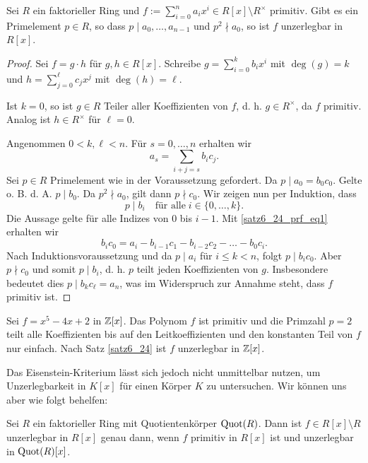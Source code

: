 \begin{satz}\label{satz6_24}
	Sei $R$ ein faktorieller Ring und $f := \sum_{i=0}^n a_i x^i \in R[x] \setminus R^\times$ primitiv. Gibt es ein Primelement $p \in R$, so dass $p \mid a_0, \dots, a_{n-1}$ und $p^2 \nmid a_0$, so ist $f$ unzerlegbar in $R[x]$.
\end{satz}
\begin{proof}
	Sei $f = g\cdot h$ für $g, h \in R[x]$. Schreibe $g = \sum_{i=0}^k b_i x^i$ mit $\deg(g) = k$ und $h = \sum_{j = 0}^\ell c_j x^j$ mit $\deg(h) = \ell$.
	
	Ist $k = 0$, so ist $g \in R$ Teiler aller Koeffizienten von $f$, d. h. $g \in R^\times$, da $f$ primitiv. Analog ist $h \in R^\times$ für $\ell = 0$.
	
	Angenommen $0 < k,\ell < n$. Für $s = 0, \dots, n$ erhalten wir
	\begin{equation}\label{satz6_24_prf_eq1}
		a_s = \sum_{i+j = s} b_i c_j.
	\end{equation}
	Sei $p \in R$ Primelement wie in der Voraussetzung gefordert. Da $p \mid a_0 = b_0 c_0$. Gelte o. B. d. A. $p \mid b_0$. Da $p^2 \nmid a_0$, gilt dann $p \nmid c_0$. Wir zeigen nun per Induktion, dass 
	\[p \mid b_i \quad \text{für alle} \; i \in \{0,\dots, k\}.\]
	Die Aussage gelte für alle Indizes von $0$ bis $i-1$. Mit \eqref{satz6_24_prf_eq1} erhalten wir
	\[b_i c_0 = a_i - b_{i-1} c_1 - b_{i-2} c_2 - \dots - b_0 c_i.\]
	Nach Induktionsvoraussetzung und da $p \mid a_i$ für $i \leq k < n$, folgt $p \mid b_i c_0$. Aber $p \nmid c_0$ und somit $p \mid b_i$, d. h. $p$ teilt jeden Koeffizienten von $g$. Insbesondere bedeutet dies $p \mid b_k c_\ell = a_n$, was im Widerspruch zur Annahme steht, dass $f$ primitiv ist.
\end{proof}
\begin{beispiel}\label{beispiel6_25}
	Sei $f = x^5 - 4x + 2$ in $\mathbb{Z}[x]$. Das Polynom $f$ ist primitiv und die Primzahl $p = 2$ teilt alle Koeffizienten bis auf den Leitkoeffizienten und den konstanten Teil von $f$ nur einfach. Nach Satz \ref{satz6_24} ist $f$ unzerlegbar in $\mathbb{Z}[x]$.
\end{beispiel}
\begin{leftbar}
	Das Eisenstein-Kriterium lässt sich jedoch nicht unmittelbar nutzen, um Unzerlegbarkeit in $K[x]$ für einen Körper $K$ zu untersuchen. Wir können uns aber wie folgt behelfen:
\end{leftbar}
\begin{satz}\label{satz6_26}
	Sei $R$ ein faktorieller Ring mit Quotientenkörper $\mathrm{Quot}(R)$. Dann ist $f \in R[x] \setminus R$ unzerlegbar in $R[x]$ genau dann, wenn $f$ primitiv in $R[x]$ ist und unzerlegbar in $\mathrm{Quot}(R)[x]$.
\end{satz}
